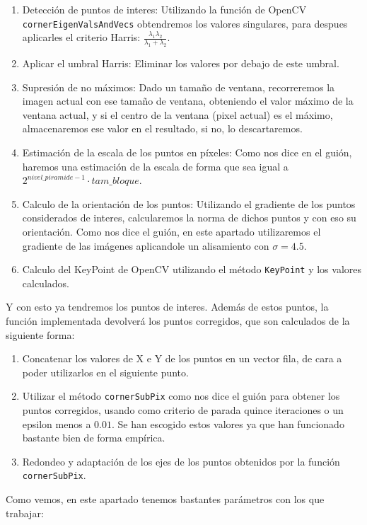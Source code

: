\documentclass[12pt, spanish]{article}
\begin{document}
\begin{enumerate}
	\item Detección de puntos de interes: Utilizando la función de OpenCV \texttt{cornerEigenValsAndVecs} obtendremos los valores singulares, para despues aplicarles el criterio Harris: $\frac{\lambda_{1} \lambda_{2}}{\lambda_{1} + \lambda_{2}}$.
	\item Aplicar el umbral Harris: Eliminar los valores por debajo de este umbral.
	\item Supresión de no máximos: Dado un tamaño de ventana, recorreremos la imagen actual con ese tamaño de ventana, obteniendo el valor máximo de la ventana actual, y si el centro de la ventana (pixel actual) es el máximo, almacenaremos ese valor en el resultado, si no, lo descartaremos.
	\item Estimación de la escala de los puntos en píxeles: Como nos dice en el guión, haremos una estimación de la escala de forma que sea igual a $2^{nivel\_piramide - 1} \cdot tam\_bloque$.
	\item Calculo de la orientación de los puntos: Utilizando el gradiente de los puntos considerados de interes, calcularemos la norma de dichos puntos y con eso su orientación. Como nos dice el guión, en este apartado utilizaremos el gradiente de las imágenes aplicandole un alisamiento con $\sigma = 4.5$.
	\item Calculo del KeyPoint de OpenCV utilizando el método \texttt{KeyPoint} y los valores calculados.
\end{enumerate}

Y con esto ya tendremos los puntos de interes. Además de estos puntos, la función implementada devolverá los puntos corregidos, que son calculados de la siguiente forma:

\begin{enumerate}
	\item Concatenar los valores de X e Y de los puntos en un vector fila, de cara a poder utilizarlos en el siguiente punto.
	\item Utilizar el método \texttt{cornerSubPix} como nos dice el guión para obtener los puntos corregidos, usando como criterio de parada quince iteraciones o un epsilon menos a $0.01$. Se han escogido estos valores ya que han funcionado bastante bien de forma empírica.
	\item Redondeo y adaptación de los ejes de los puntos obtenidos por la función \texttt{cornerSubPix}.
\end{enumerate}


Como vemos, en este apartado tenemos bastantes parámetros con los que trabajar:
\end{document}
